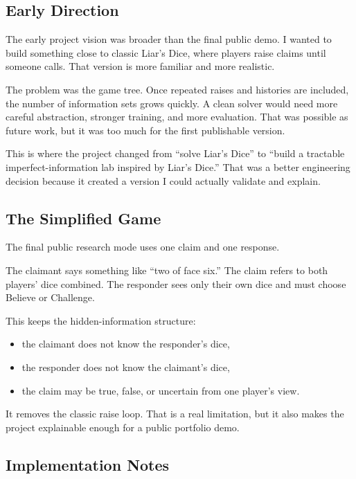 \documentclass[
]{article}
\providecommand{\tightlist}{%
  \setlength{\itemsep}{0pt}\setlength{\parskip}{0pt}}
\begin{document}
\subsection{Early Direction}\label{early-direction}

The early project vision was broader than the final public demo. I
wanted to build something close to classic Liar's Dice, where players
raise claims until someone calls. That version is more familiar and more
realistic.

The problem was the game tree. Once repeated raises and histories are
included, the number of information sets grows quickly. A clean solver
would need more careful abstraction, stronger training, and more
evaluation. That was possible as future work, but it was too much for
the first publishable version.

This is where the project changed from ``solve Liar's Dice'' to ``build
a tractable imperfect-information lab inspired by Liar's Dice.'' That
was a better engineering decision because it created a version I could
actually validate and explain.

\subsection{The Simplified Game}\label{the-simplified-game}

The final public research mode uses one claim and one response.

The claimant says something like ``two of face six.'' The claim refers
to both players' dice combined. The responder sees only their own dice
and must choose Believe or Challenge.

This keeps the hidden-information structure:

\begin{itemize}
\tightlist
\item
  the claimant does not know the responder's dice,
\item
  the responder does not know the claimant's dice,
\item
  the claim may be true, false, or uncertain from one player's view.
\end{itemize}

It removes the classic raise loop. That is a real limitation, but it
also makes the project explainable enough for a public portfolio demo.

\subsection{Implementation Notes}\label{implementation-notes}
\end{document}

